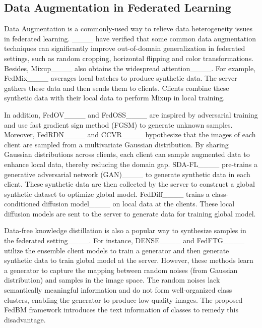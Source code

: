 \subsection{Data Augmentation in Federated Learning}
Data Augmentation is a commonly-used way to relieve data heterogeneity issues in federated learning. 
____ have verified that some common data augmentation techniques can significantly improve out-of-domain generalization in federated settings, such as random cropping,  horizontal flipping and color transformations. Besides, Mixup____ also obtains the widespread attention____. For example, FedMix____ averages local batches to produce synthetic data. The server gathers these data and then sends them to clients. Clients combine these synthetic data with their local data to perform Mixup in local training.

In addition, FedOV____ and FedOSS____ are inspired by adversarial training and use fast gradient sign method (FGSM) to generate unknown samples.
Moreover, FedRDN____ and CCVR____ hypothesize that the images of each client are sampled from a multivariate Gaussian distribution. By sharing Gaussian distributions across clients, each client can sample augmented data to enhance local data, thereby reducing the domain gap.
SDA-FL____ pre-trains a generative adversarial network (GAN)____ to generate synthetic data in each client. These synthetic data are then collected by the server to construct a global synthetic dataset to optimize global model. 
FedDiff____ trains a class-conditioned diffusion model____ on local data at the clients. These local diffusion models are sent to the server to generate data for training global model.

Data-free knowledge distillation is also a popular way to synthesize samples in the federated setting____. For instance, DENSE____ and FedFTG____ utilize the ensemble client models to train a generator and then generate synthetic data to train global model at the server. However, these methods learn a generator to capture the mapping between random noises (from Gaussian distribution) and samples in the image space. The random noises lack semantically meaningful information and do not form well-organized class clusters, enabling the generator to produce low-quality images. The proposed FedBM framework introduces the text information of classes to remedy this disadvantage.